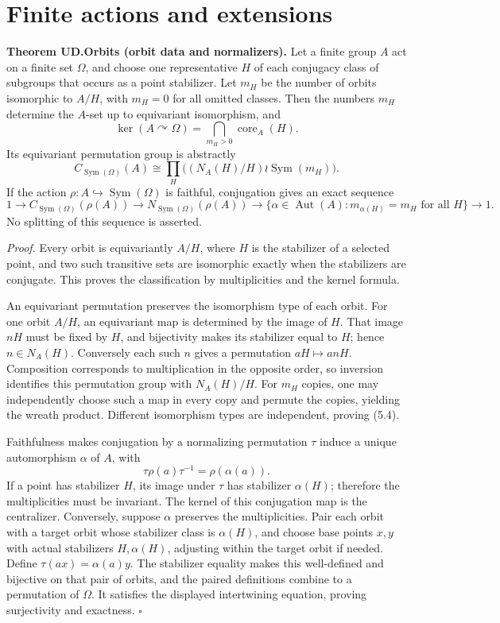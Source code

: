 \section{Finite actions and
extensions}\label{finite-actions-and-extensions}

\textbf{Theorem UD.Orbits (orbit data and normalizers).} Let a finite
group \(A\) act on a finite set \(\Omega\), and choose one
representative \(H\) of each conjugacy class of subgroups that occurs as
a point stabilizer. Let \(m_H\) be the number of orbits isomorphic to
\(A/H\), with \(m_H=0\) for all omitted classes. Then the numbers
\(m_H\) determine the \(A\)-set up to equivariant isomorphism, and \[
\ker(A\curvearrowright\Omega)=\bigcap_{m_H>0}\operatorname{core}_A(H).
\tag{5.3}
\] Its equivariant permutation group is abstractly \[
C_{\operatorname{Sym}(\Omega)}(A)\cong
\prod_H\bigl((N_A(H)/H)\wr\operatorname{Sym}(m_H)\bigr).
\tag{5.4}
\] If the action \(\rho:A\hookrightarrow\operatorname{Sym}(\Omega)\) is
faithful, conjugation gives an exact sequence \[
1\longrightarrow C_{\operatorname{Sym}(\Omega)}(\rho(A))
\longrightarrow N_{\operatorname{Sym}(\Omega)}(\rho(A))
\longrightarrow
\{\alpha\in\operatorname{Aut}(A):m_{\alpha(H)}=m_H\text{ for all }H\}
\longrightarrow1.
\tag{5.5}
\] No splitting of this sequence is asserted.

\emph{Proof.} Every orbit is equivariantly \(A/H\), where \(H\) is the
stabilizer of a selected point, and two such transitive sets are
isomorphic exactly when the stabilizers are conjugate. This proves the
classification by multiplicities and the kernel formula.

An equivariant permutation preserves the isomorphism type of each orbit.
For one orbit \(A/H\), an equivariant map is determined by the image of
\(H\). That image \(nH\) must be fixed by \(H\), and bijectivity makes
its stabilizer equal to \(H\); hence \(n\in N_A(H)\). Conversely each
such \(n\) gives a permutation \(aH\mapsto anH\). Composition
corresponds to multiplication in the opposite order, so inversion
identifies this permutation group with \(N_A(H)/H\). For \(m_H\) copies,
one may independently choose such a map in every copy and permute the
copies, yielding the wreath product. Different isomorphism types are
independent, proving (5.4).

Faithfulness makes conjugation by a normalizing permutation \(\tau\)
induce a unique automorphism \(\alpha\) of \(A\), with \[
\tau\rho(a)\tau^{-1}=\rho(\alpha(a)).
\] If a point has stabilizer \(H\), its image under \(\tau\) has
stabilizer \(\alpha(H)\); therefore the multiplicities must be
invariant. The kernel of this conjugation map is the centralizer.
Conversely, suppose \(\alpha\) preserves the multiplicities. Pair each
orbit with a target orbit whose stabilizer class is \(\alpha(H)\), and
choose base points \(x,y\) with actual stabilizers \(H,\alpha(H)\),
adjusting within the target orbit if needed. Define
\(\tau(ax)=\alpha(a)y\). The stabilizer equality makes this well-defined
and bijective on that pair of orbits, and the paired definitions combine
to a permutation of \(\Omega\). It satisfies the displayed intertwining
equation, proving surjectivity and exactness. \(\square\)

